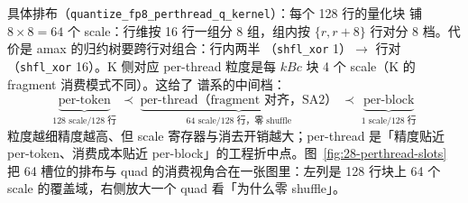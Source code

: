 具体排布（\texttt{quantize\_fp8\_perthread\_q\_kernel}）：每个 128 行的量化块
铺 $8\times 8 = 64$ 个 scale：行维按 16 行一组分 8 组，组内按
$\{r,r+8\}$ 行对分 8 档。代价是 amax 的归约树要跨行对组合：行内两半
（\texttt{shfl\_xor} 1）$\to$ 行对（\texttt{shfl\_xor} 16）。K 侧对应
per-thread 粒度是每 $kBc$ 块 4 个 scale（K 的 fragment 消费模式不同）。这给了
谱系的中间档：
\begin{equation}
  \underbrace{\text{per-token}}_{\text{128 scale/128 行}}
  \;\prec\;
  \underbrace{\text{per-thread（fragment 对齐，SA2）}}_{\text{64 scale/128 行，零 shuffle}}
  \;\prec\;
  \underbrace{\text{per-block}}_{\text{1 scale/128 行}}
\end{equation}
粒度越细精度越高、但 scale 寄存器与消去开销越大；per-thread 是「精度贴近
per-token、消费成本贴近 per-block」的工程折中点。图~\ref{fig:28-perthread-slots}
把 64 槽位的排布与 quad 的消费视角合在一张图里：左列是 128 行块上 64 个
scale 的覆盖域，右侧放大一个 quad 看「为什么零 shuffle」。

